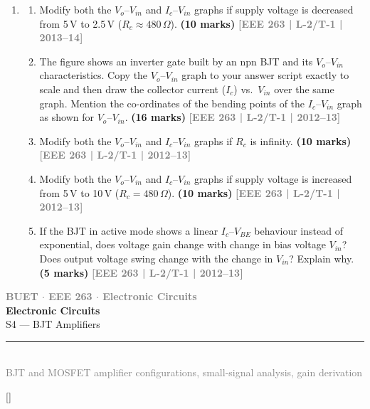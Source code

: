 \documentclass[12pt]{article}
\newcommand{\yr}[1]{\hfill\textcolor{gray}{\small\textbf{[#1]}}}
\newcommand{\mk}[1]{\textcolor{orange!70!black}{\small\textbf{(#1 marks)}}}
\newcommand{\secdivider}[3]{%
  \newpage\thispagestyle{empty}%
  \vspace*{\fill}%
  \begin{tcolorbox}[enhanced,colback=#3!6,colframe=#3,boxrule=1.5pt,arc=8pt,
    left=20pt,right=20pt,top=22pt,bottom=22pt,
    shadow={3pt}{-3pt}{0pt}{black!15}]
    \centering
    {\large\textcolor{gray}{\textbf{BUET $\cdot$ EEE 263 $\cdot$ Electronic Circuits}}}\\[8pt]
    {\fontsize{26}{32}\selectfont\bfseries\textcolor{#3}{Electronic Circuits}}\\[6pt]
    {\fontsize{15}{19}\selectfont\textcolor{dgray}{#1}}\\[12pt]
    \textcolor{#3!60}{\rule{0.5\textwidth}{0.5pt}}\\[6pt]
    {\small\textcolor{gray}{#2}}
  \end{tcolorbox}%
  \vspace*{\fill}\newpage%
}
\begin{document}
\begin{enumerate}
\item
\begin{enumerate}
\item Modify both the $V_o$--$V_{in}$ and $I_c$--$V_{in}$ graphs if supply voltage is decreased from 5\,V to 2.5\,V ($R_c \approx 480\,\Omega$).
\mk{10} \yr{EEE 263 | L-2/T-1 | 2013--14}

\begin{center}
    \invckt\hspace{1cm}
\end{center}

\item The figure shows an inverter gate built by an npn BJT and its $V_o$--$V_{in}$ characteristics. Copy the $V_o$--$V_{in}$ graph to your answer script exactly to scale and then draw the collector current ($I_c$) vs.\ $V_{in}$ over the same graph. Mention the co-ordinates of the bending points of the $I_c$--$V_{in}$ graph as shown for $V_o$--$V_{in}$.
\mk{16} \yr{EEE 263 | L-2/T-1 | 2012--13}

\item Modify both the $V_o$--$V_{in}$ and $I_c$--$V_{in}$ graphs if $R_c$ is infinity.
\mk{10} \yr{EEE 263 | L-2/T-1 | 2012--13}

\item Modify both the $V_o$--$V_{in}$ and $I_c$--$V_{in}$ graphs if supply voltage is increased from 5\,V to 10\,V ($R_c=480\,\Omega$).
\mk{10} \yr{EEE 263 | L-2/T-1 | 2012--13}

\item If the BJT in active mode shows a linear $I_c$--$V_{BE}$ behaviour instead of exponential, does voltage gain change with change in bias voltage $V_{in}$? Does output voltage swing change with the change in $V_{in}$? Explain why.
\mk{5} \yr{EEE 263 | L-2/T-1 | 2012--13}

\end{enumerate}


\end{enumerate}


\secdivider{S4 --- BJT Amplifiers}{BJT and MOSFET amplifier configurations, small-signal analysis, gain derivation}{cC}

\titleformat{\section}{\large\bfseries\color{cC}}{}{0em}{}[\titlerule]
\end{document}
